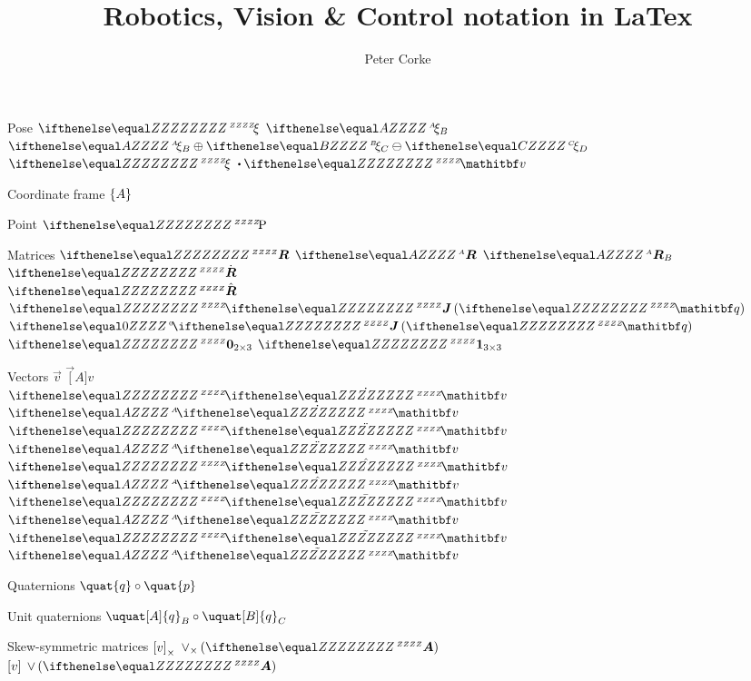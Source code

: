 \documentclass{article}
\title{Robotics, Vision \& Control notation in LaTex}
\author{Peter Corke}
\date{}
\begin{document}
\maketitle
\begin{exampleA}[righthand width=3.5cm,center lower]{Pose}
$\pose$  $\pose[A]_B$  \\
$\pose[A]_B \oplus \pose[B]_C \ominus \pose[C]_D$  \\
$\pose \sbullet \vec{v}$
\end{exampleA}

\begin{exampleA}[righthand width=3.5cm,center lower]{Coordinate frame}
$\{A\}$
\end{exampleA}

\begin{exampleA}[righthand width=3.5cm,center lower]{Point}
$\point{P}$
\end{exampleA}

\begin{exampleA}[righthand width=3.5cm,center lower]{Matrices}
$\mat{R}$  $\mat[A]R$  $\mat[A]{R}_B$ \\
$\dmat{R}$ \\
$\emat{R}$ \\
$\matfn{J}{\vec{q}}$   $\matfn[0]{J}{\vec{q}}$ \\
$\mat{0}_{2 \times 3}$   $\mat{1}_{3 \times 3}$
\end{exampleA}


\begin{exampleA}[righthand width=3.5cm,center lower]{Vectors}
$\vec{v}$  $\vec[A]{v}$  \\
$\dvec{v}$  $\dvec[A]{v}$  \\
$\ddvec{v}$  $\ddvec[A]{v}$  \\
$\evec{v}$  $\evec[A]{v}$  \\
$\bvec{v}$  $\bvec[A]{v}$ \\
$\hvec{v}$  $\hvec[A]{v}$
\end{exampleA}

\begin{exampleA}[righthand width=3.5cm,center lower]{Quaternions}
$\quat{q} \circ \quat{p}$ 
\end{exampleA}

\begin{exampleA}[righthand width=3.5cm,center lower]{Unit quaternions}
$\uquat[A]{q}_B \circ \uquat[B]{q}_C$
\end{exampleA}

\begin{exampleA}[righthand width=3.5cm,center lower]{Skew-symmetric matrices}
$\left[v\right]_{\times}$  $\iskx{\mat{A}}$ \\
$\left[v\right]$  $\isk{\mat{A}}$ 
\end{exampleA}
\end{document}
